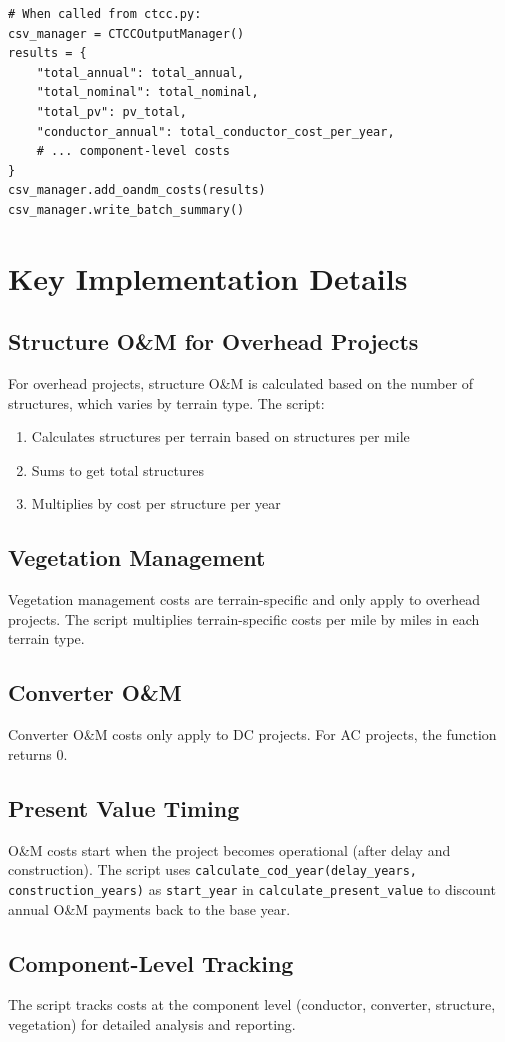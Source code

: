\documentclass[ctcc_full_documentation.tex]{subfiles}
\begin{document}
\begin{lstlisting}
# When called from ctcc.py:
csv_manager = CTCCOutputManager()
results = {
    "total_annual": total_annual,
    "total_nominal": total_nominal,
    "total_pv": pv_total,
    "conductor_annual": total_conductor_cost_per_year,
    # ... component-level costs
}
csv_manager.add_oandm_costs(results)
csv_manager.write_batch_summary()
\end{lstlisting}

\section{Key Implementation Details}

\subsection{Structure O\&M for Overhead Projects}

For overhead projects, structure O\&M is calculated based on the number of structures, which varies by terrain type. The script:
\begin{enumerate}
    \item Calculates structures per terrain based on structures per mile
    \item Sums to get total structures
    \item Multiplies by cost per structure per year
\end{enumerate}

\subsection{Vegetation Management}

Vegetation management costs are terrain-specific and only apply to overhead projects. The script multiplies terrain-specific costs per mile by miles in each terrain type.

\subsection{Converter O\&M}

Converter O\&M costs only apply to DC projects. For AC projects, the function returns 0.

\subsection{Present Value Timing}

O\&M costs start when the project becomes operational (after delay and construction). The script uses \texttt{calculate\_cod\_year(delay\_years, construction\_years)} as \texttt{start\_year} in \texttt{calculate\_present\_value} to discount annual O\&M payments back to the base year.

\subsection{Component-Level Tracking}

The script tracks costs at the component level (conductor, converter, structure, vegetation) for detailed analysis and reporting.
\end{document}
